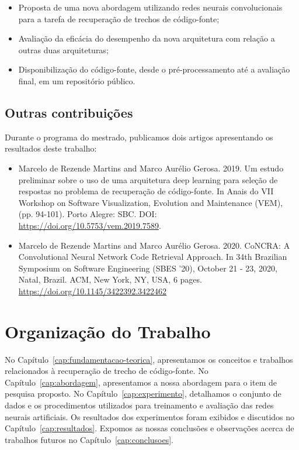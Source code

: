 \begin{itemize}
\item Proposta de uma nova abordagem utilizando redes neurais convolucionais para a tarefa de recuperação de trechos de código-fonte;
\item Avaliação da eficácia do desempenho da nova arquitetura com relação a outras duas arquiteturas;
\item Disponibilização do código-fonte, desde o pré-processamento até a avaliação final, em um repositório público.
\end{itemize}

\subsection{Outras contribuições}

Durante o programa do mestrado, publicamos dois artigos apresentando os resultados deste trabalho:

\begin{itemize}
    \item Marcelo de Rezende Martins and Marco Aurélio Gerosa. 2019. Um estudo preliminar sobre o uso de uma arquitetura deep learning para seleção de respostas no problema de recuperação de código-fonte. In Anais do VII Workshop on Software Visualization, Evolution and Maintenance (VEM), (pp. 94-101). Porto Alegre: SBC. DOI: \url{https://doi.org/10.5753/vem.2019.7589}.
    \item Marcelo de Rezende Martins and Marco Aurélio Gerosa. 2020. CoNCRA: A Convolutional Neural Network Code Retrieval Approach. In 34th Brazilian Symposium on Software Engineering (SBES ’20), October 21 - 23, 2020, Natal, Brazil. ACM, New York, NY, USA, 6 pages. \url{https://doi.org/10.1145/3422392.3422462}
\end{itemize}


\section{Organização do Trabalho}
\label{sec:organizacao_trabalho}

No Capítulo~\ref{cap:fundamentacao-teorica}, apresentamos os conceitos e trabalhos relacionados à recuperação de trecho de código-fonte. No Capítulo~\ref{cap:abordagem}, apresentamos a nossa abordagem para o item de pesquisa proposto. No Capítulo~\ref{cap:experimento}, detalhamos o conjunto de dados e os procedimentos utilizados para treinamento e avaliação das redes neurais artificiais. Os resultados dos experimentos foram exibidos e discutidos no Capítulo~\ref{cap:resultados}. Expomos as nossas conclusões e observações acerca de trabalhos futuros no Capítulo~\ref{cap:conclusoes}.